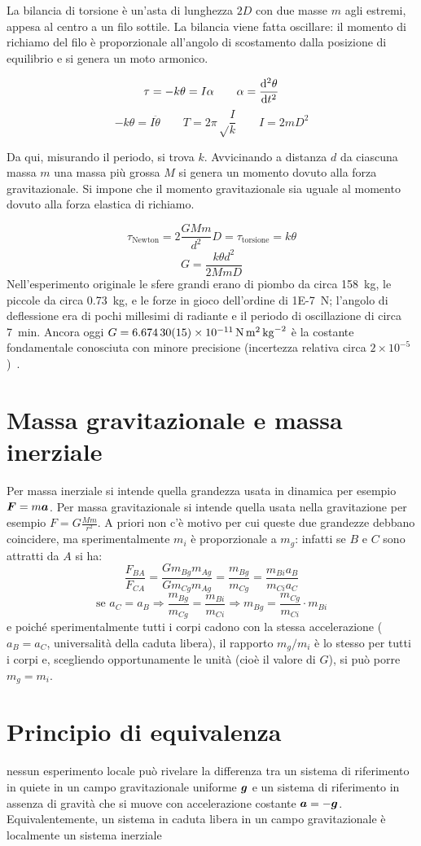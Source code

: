 La bilancia di torsione è un'asta di lunghezza $2D$ con due masse $m$ agli estremi, appesa al centro a un filo sottile. La bilancia viene fatta oscillare: il momento di richiamo del filo è
proporzionale all'angolo di scostamento dalla posizione di
equilibrio e si genera un moto armonico.

\[\tau=-k\theta=I\alpha\qquad\alpha=\frac{\mathrm{d}^2\theta}{\mathrm{d} t^2}\]
\[-k\theta=I\ddot\theta\qquad T=2\pi\sqrt\frac{I}{k}\qquad I=2mD^2\]


Da qui, misurando il periodo, si trova $k$. Avvicinando a distanza $d$ da ciascuna massa $m$ una massa più
grossa $M$ si genera un momento dovuto alla forza gravitazionale. Si
impone che il momento gravitazionale sia uguale al momento dovuto
alla forza elastica di richiamo.

\[\tau_\text{Newton}=2\frac{GMm}{d^2}D=\tau_\text{torsione}=k\theta\]
\[G=\frac{k\theta d^2}{2MmD}\]
Nell'esperimento originale le sfere grandi erano di piombo da circa \SI{158}{\kilo\gram}, le piccole da circa \SI{0.73}{\kilo\gram}, e le forze in gioco dell'ordine di \SI{1E-7}{\newton}; l'angolo di deflessione era di pochi millesimi di radiante e il periodo di oscillazione di circa \SI{7}{\minute}. Ancora oggi $G=\SI{6.67430(15)E-11}{\newton\meter\squared\per\kilo\gram\squared}$ è la costante fondamentale conosciuta con minore precisione (incertezza relativa circa $2\times10^{-5}$)~\cite{codata2018}.
\section{Massa gravitazionale e massa inerziale}
Per massa inerziale si intende quella grandezza usata in dinamica
per esempio \mbox{$\boldsymbol{F}=m\boldsymbol{a}$}. Per massa gravitazionale si intende quella usata nella gravitazione per esempio $F=G\frac{Mm}{r^2}$. A priori non c'è motivo per cui queste due grandezze debbano coincidere, ma sperimentalmente $m_i$ è proporzionale a $m_g$: infatti se $B$ e $C$ sono attratti da $A$ si ha:
\[\frac{F_{BA}}{F_{CA}}=\frac{Gm_{Bg}m_{Ag}}{Gm_{Cg}m_{Ag}}=\frac{m_{Bg}}{m_{Cg}}=\frac{m_{Bi}a_B}{m_{Ci}a_C}\]
\[\text{se }a_C=a_B\Rightarrow\frac{m_{Bg}}{m_{Cg}}=\frac{m_{Bi}}{m_{Ci}}\Rightarrow
  m_{Bg}=\frac{m_{Cg}}{m_{Ci}}\cdot m_{Bi}\]
e poiché sperimentalmente tutti i corpi cadono con la stessa accelerazione ($a_B=a_C$, universalità della caduta libera), il rapporto $m_g/m_i$ è lo stesso per tutti i corpi e, scegliendo opportunamente le unità (cioè il valore di $G$), si può porre $m_g=m_i$.
\section{Principio di equivalenza}
\begin{Pri}
  nessun esperimento locale può rivelare la differenza tra un sistema di riferimento in quiete in un campo gravitazionale uniforme $\boldsymbol{g}$ e un sistema di riferimento in assenza di gravità che si muove con accelerazione costante $\boldsymbol{a}=-\boldsymbol{g}$. Equivalentemente, un sistema in caduta libera in un campo gravitazionale è localmente un sistema inerziale
\end{Pri}
